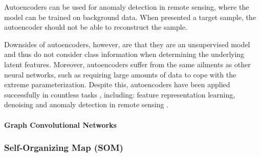 Autoencoders can be used for anomaly detection in remote sensing, where the model can be trained on background data.  When presented a target sample, the autoencoder should not be able to reconstruct the sample.

Downsides of autoencoders, however, are that they are an unsupervised model and thus do not consider class information when determining the underlying latent features.  Moreover, autoencoders suffer from the same ailments as other neural networks, such as requiring large amounts of data to cope with the extreme parameterization.  Despite this, autoencoders have been applied successfully in countless tasks \citep{Tschannen2018RecentAdvancesAutoencoder, Yuan2019AutoencoderSurvey, Chen2019DeepAutoencoders}, including: feature representation learning, denoising and anomaly detection in remote sensing \citep{Bengio2014RepLearningReview}.

\paragraph{Graph Convolutional Networks} \label{sec:Graph_CNN}


\subsubsection{Self-Organizing Map (SOM)} \label{sec:SOM}

